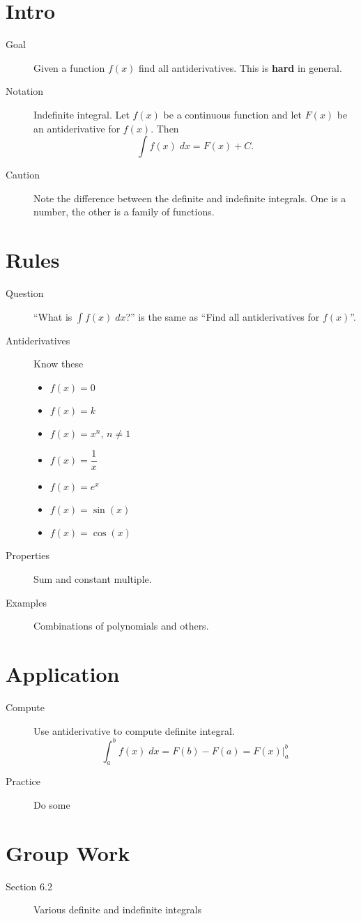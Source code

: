 \documentclass[11pt]{article}
\begin{document}
\drawtitle

\section*{Intro}
\begin{description}
\item[Goal] Given a function $f(x)$ find all antiderivatives.  This is
  \textbf{hard} in general.
\item[Notation] Indefinite integral.  Let $f(x)$ be a continuous
  function and let $F(x)$ be an antiderivative for $f(x)$.  Then
  \[
  \int f(x)\;dx = F(x)+C.
  \]
\item[Caution] Note the difference between the definite and indefinite
  integrals.  One is a number, the other is a family of functions.
\end{description}

\section*{Rules}
\begin{description}
\item[Question] ``What is $\int f(x)\;dx$?'' is the same as ``Find all
  antiderivatives for $f(x)$''.
\item[Antiderivatives] Know these
  \begin{multicols}{2}
    \begin{itemize}
    \item $f(x)=0$
    \item $f(x)=k$
    \item $f(x)=x^n$, $n\neq 1$
    \item $f(x)=\dfrac{1}{x}$
    \item $f(x)=e^x$
    \item $f(x)=\sin(x)$
    \item $f(x)=\cos(x)$
    \end{itemize}
  \end{multicols}
\item[Properties] Sum and constant multiple.
\item[Examples] Combinations of polynomials and others.
\end{description}

\section*{Application}
\begin{description}
\item[Compute] Use antiderivative to compute definite integral.
  \[
  \int_a^b f(x)\;dx=F(b)-F(a)=F(x)\Big\vert_a^b
  \]
\item[Practice] Do some
\end{description}

\section*{Group Work}
\begin{description}
\item[Section 6.2] Various definite and indefinite integrals
\end{description}
\end{document}
